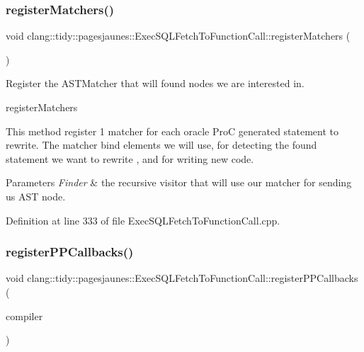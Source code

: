\subsubsection{\texorpdfstring{register\+Matchers()}{registerMatchers()}}
{\footnotesize\ttfamily void clang\+::tidy\+::pagesjaunes\+::\+Exec\+S\+Q\+L\+Fetch\+To\+Function\+Call\+::register\+Matchers (\begin{DoxyParamCaption}\item[{ast\+\_\+matchers\+::\+Match\+Finder $\ast$}]{ }\end{DoxyParamCaption})\hspace{0.3cm}{\ttfamily [override]}}



Register the A\+S\+T\+Matcher that will found nodes we are interested in. 

register\+Matchers

This method register 1 matcher for each oracle ProC generated statement to rewrite. The matcher bind elements we will use, for detecting the found statement we want to rewrite , and for writing new code.


\begin{DoxyParams}{Parameters}
{\em Finder} & the recursive visitor that will use our matcher for sending us A\+ST node. \\
\hline
\end{DoxyParams}


Definition at line 333 of file Exec\+S\+Q\+L\+Fetch\+To\+Function\+Call.\+cpp.

\mbox{\label{classclang_1_1tidy_1_1pagesjaunes_1_1_exec_s_q_l_fetch_to_function_call_af6724b81cf61f7a0d3c2289c1a6cbc8e}} 
\subsubsection{\texorpdfstring{register\+P\+P\+Callbacks()}{registerPPCallbacks()}}
{\footnotesize\ttfamily void clang\+::tidy\+::pagesjaunes\+::\+Exec\+S\+Q\+L\+Fetch\+To\+Function\+Call\+::register\+P\+P\+Callbacks (\begin{DoxyParamCaption}\item[{Compiler\+Instance \&}]{compiler }\end{DoxyParamCaption})\hspace{0.3cm}{\ttfamily [override]}}



